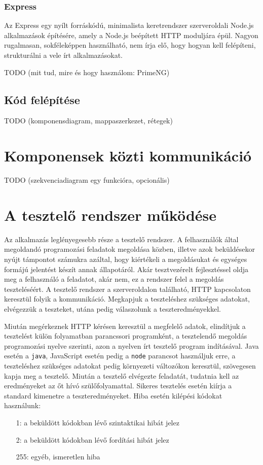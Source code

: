 \documentclass{elteikthesis}
\begin{document}
				\subsubsection{Express}
					Az Express \cite{express} egy nyílt forráskódú, minimalista keretrendszer szerveroldali Node.js alkalmazások építésére, amely a Node.js beépített HTTP moduljára épül. Nagyon rugalmasan, sokféleképpen használható, nem írja elő, hogy hogyan kell felépíteni, strukturálni a vele írt alkalmazásokat.

			TODO (mit tud, mire és hogy használom: PrimeNG)
			
			\subsection{Kód felépítése}
			TODO (komponensdiagram, mappaszerkezet, rétegek)
		
		\section{Komponensek közti kommunikáció}
		TODO (szekvenciadiagram egy funkcióra, opcionális)

		\section{A tesztelő rendszer működése}
			Az alkalmazás leglényegesebb része a tesztelő rendszer. A felhasználók által megoldandó programozási feladatok megoldása közben, illetve azok beküldésekor nyújt támpontot számukra azáltal, hogy kiértékeli a megoldásukat és egységes formájú jelentést készít annak állapotáról. Akár tesztvezérelt fejlesztéssel oldja meg a felhasználó a feladatot, akár nem, ez a rendszer felel a megoldás teszteléséért. A tesztelő rendszer a szerveroldalon található, HTTP kapcsolaton keresztül folyik a kommunikáció. Megkapjuk a teszteléshez szükséges adatokat, elvégezzük a teszteket, utána pedig válaszolunk a teszteredményekkel.
			
			Miután megérkeznek HTTP kérésen keresztül a megfelelő adatok, elindítjuk a tesztelést külön folyamatban parancssori programként, a tesztelendő megoldás programozási nyelve szerinti, azon a nyelven írt tesztelő program indításával. Java esetén a \texttt{java}, JavaScript esetén pedig a \texttt{node} parancsot használjuk erre, a teszteléshez szükséges adatokat pedig környezeti változókon keresztül, szövegesen kapja meg a tesztelő. Miután a tesztelő elvégezte feladatát, tudatnia kell az eredményeket az őt hívó szülőfolyamattal. Sikeres tesztelés esetén kiírja a standard kimenetre a teszteredményeket. Hiba esetén kilépési kódokat használunk:
			\begin{itemize}
				\setlength\itemsep{-0.5em}
				\item[1:] a beküldött kódokban lévő szintaktikai hibát jelez
				\item[2:] a beküldött kódokban lévő fordítási hibát jelez
				\item[255:] egyéb, ismeretlen hiba
			\end{itemize}
\end{document}
